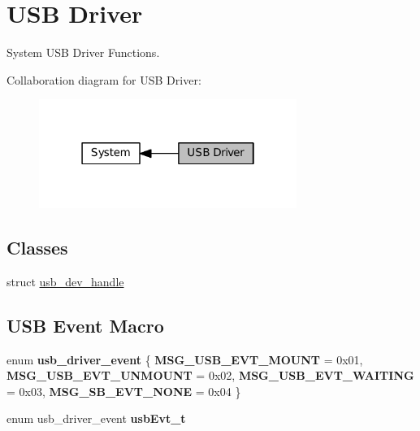 \hypertarget{group__SYSTEM__USB__DRIVER}{}\section{U\+SB Driver}
\label{group__SYSTEM__USB__DRIVER}


System U\+SB Driver Functions.  


Collaboration diagram for U\+SB Driver\+:\nopagebreak
\begin{figure}[H]
\begin{center}
\leavevmode
\includegraphics[width=238pt]{group__SYSTEM__USB__DRIVER}
\end{center}
\end{figure}
\subsection*{Classes}
\begin{DoxyCompactItemize}
\item 
struct \hyperlink{structusb__dev__handle}{usb\+\_\+dev\+\_\+handle}
\end{DoxyCompactItemize}
\subsection*{U\+SB Event Macro}
\begin{DoxyCompactItemize}
\item 
\mbox{\label{group__SYSTEM__USB__DRIVER_ga9b9388bbbf745b6cff8609792c63490d}} 
enum {\bfseries usb\+\_\+driver\+\_\+event} \{ {\bfseries M\+S\+G\+\_\+\+U\+S\+B\+\_\+\+E\+V\+T\+\_\+\+M\+O\+U\+NT} = 0x01, 
{\bfseries M\+S\+G\+\_\+\+U\+S\+B\+\_\+\+E\+V\+T\+\_\+\+U\+N\+M\+O\+U\+NT} = 0x02, 
{\bfseries M\+S\+G\+\_\+\+U\+S\+B\+\_\+\+E\+V\+T\+\_\+\+W\+A\+I\+T\+I\+NG} = 0x03, 
{\bfseries M\+S\+G\+\_\+\+S\+B\+\_\+\+E\+V\+T\+\_\+\+N\+O\+NE} = 0x04
 \}
\item 
\mbox{\label{group__SYSTEM__USB__DRIVER_ga1bee7d22386716ee60aef5b482b5fa7e}} 
enum usb\+\_\+driver\+\_\+event {\bfseries usb\+Evt\+\_\+t}
\end{DoxyCompactItemize}
